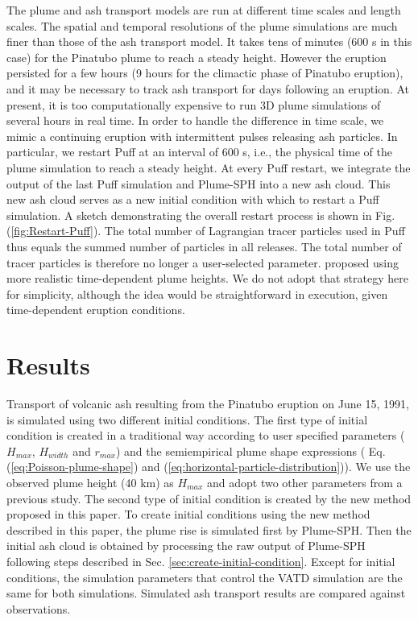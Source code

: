 \documentclass[utf8]{frontiersSCNS} %
\begin{document}
The plume and ash transport models are run at different time scales and length scales. The spatial and temporal resolutions of the plume simulations are much finer than those of the ash transport model. It takes tens of minutes (600 s in this case) for the Pinatubo plume to reach a steady height. However the eruption persisted for a few hours (9 hours for the climactic phase of Pinatubo eruption), and it may be necessary to track ash transport for days following an eruption. At present, it is too computationally expensive to run 3D plume simulations of several hours in real time. In order to handle the difference in time scale, we mimic a continuing eruption with intermittent pulses releasing ash particles. In particular, we restart Puff at an interval of 600 s, i.e., the physical time of the plume simulation to reach a steady height. At every Puff restart, we integrate the output of the last Puff simulation and Plume-SPH into a new ash cloud. This new ash cloud serves as a new initial condition with which to restart a Puff simulation. A sketch demonstrating the overall restart process is shown in Fig. (\ref{fig:Restart-Puff}). The total number of Lagrangian tracer particles used in Puff thus equals the summed number of particles in all releases. The total number of tracer particles is therefore no longer a user-selected parameter. \citet{fero2008simulation} proposed using more realistic time-dependent plume heights. We do not adopt that strategy here for simplicity, although the idea would be straightforward in execution, given time-dependent eruption conditions.

\section{Results}

Transport of volcanic ash resulting from the Pinatubo eruption on June 15, 1991, is simulated using two different initial conditions.
The first type of initial condition is created in a traditional way according to user specified parameters ($H_{max}$, $H_{width}$ and $r_{max}$) and the semiempirical plume shape expressions ( Eq. (\ref{eq:Poisson-plume-shape}) and (\ref{eq:horizontal-particle-distribution})). We use the observed plume height (40 km) as $H_{max}$ and adopt two other parameters from a previous study\citep{fero2008simulation}. The second type of initial condition is created by the new method proposed in this paper. To create initial conditions using the new method described in this paper, the plume rise is simulated first by Plume-SPH. Then the initial ash cloud is obtained by processing the raw output of Plume-SPH following steps described in Sec. \ref{sec:create-initial-condition}. Except for initial conditions, the simulation parameters that control the VATD simulation are the same for both simulations. Simulated ash transport results are compared against observations.
\end{document}
